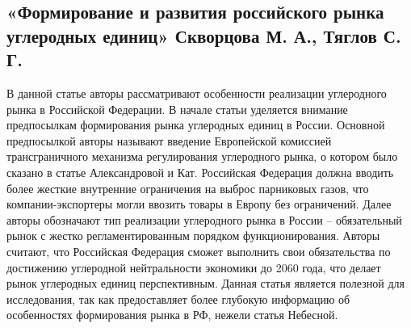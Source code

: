 \documentclass[a4paper,14pt]{article}
\begin{document}
\subsection{«Формирование и развития российского рынка углеродных единиц» Скворцова М. А., Тяглов С. Г.}
В данной статье авторы рассматривают особенности реализации углеродного рынка в Российской Федерации. В начале статьи уделяется внимание предпосылкам формирования рынка углеродных единиц в России. Основной предпосылкой авторы называют введение Европейской комиссией трансграничного механизма регулирования углеродного рынка, о котором было сказано в статье Александровой и Кат. Российская Федерация должна вводить более жесткие внутренние ограничения на выброс парниковых газов, что компании-экспортеры могли ввозить товары в Европу без ограничений. Далее авторы обозначают тип реализации углеродного рынка в России – обязательный рынок с жестко регламентированным порядком функционирования. Авторы считают, что Российская Федерация сможет выполнить свои обязательства по достижению углеродной нейтральности экономики до 2060 года, что делает рынок углеродных единиц перспективным. Данная статья является полезной для исследования, так как предоставляет более глубокую информацию об особенностях формирования рынка в РФ, нежели статья Небесной. 
\end{document}
